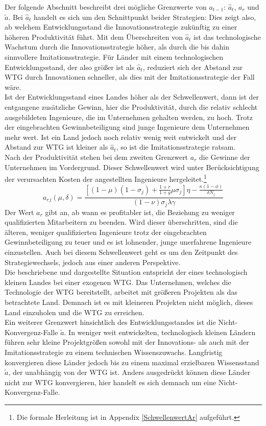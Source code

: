 %
Der folgende Abschnitt beschreibt drei mögliche Grenzwerte von $a_{t-1}$: $\hat{a}_t$, $a_r$ und $\tilde{a}$.  Bei $\hat{a}_t$ handelt es sich um den Schnittpunkt beider Strategien: Dies zeigt also, ab welchem Entwicklungsstand die Innovationsstrategie zukünftig zu einer höheren Produktivität führt.
Mit dem Überschreiten von $\hat{a}_t$ ist das technologische Wachstum durch die \textcolor[rgb]{0.74,0.97,0.22}{Innovationsstrategie} höher, als durch die bis dahin sinnvollere \textcolor[rgb]{0,0.32,0}{Imitationsstrategie}. 
Für Länder mit einem technologischen Entwicklungsstand, der also größer ist als $\hat{a}_t$, reduziert sich der Abstand zur WTG durch Innovationen schneller, als dies mit der \textcolor[rgb]{0,0.32,0}{Imitationsstrategie} der Fall wäre.\\
%
Ist der Entwicklungsstand eines Landes höher als der Schwellenwert, dann ist der entgangene zusätzliche Gewinn, hier die Produktivität, durch die relativ schlecht ausgebildeten Ingenieure, die im Unternehmen gehalten werden, zu hoch. Trotz der eingebrachten Gewinnbeteiligung sind junge Ingenieure dem Unternehmen mehr wert. Ist ein Land jedoch noch relativ wenig weit entwickelt und der Abstand zur WTG ist kleiner als $\hat{a}_t$, so ist die \textcolor[rgb]{0,0.32,0}{Imitationsstrategie} ratsam.\\
%
Nach der Produktivität stehen bei dem zweiten Grenzwert $a_r$ die Gewinne der Unternehmen im Vordergrund. Dieser Schwellenwert wird unter Berücksichtigung der verursachten Kosten der angestellten Ingenieure hergeleitet.\footnote{Die formale Herleitung ist in Appendix \ref{SchwellenwertAr} aufgeführt.}
%
	\begin{equation}
		a_r{_j}(\mu,\delta)=\frac{[(1-\mu)(1-\sigma_j)+\frac{1+r}{1+g}\mu\sigma_j]\eta-\frac{\kappa(1-\phi)}{\delta N_j}}{(1-\nu)\sigma_j\lambda\gamma} \label{Schwellenwert Kosten}
	\end{equation}
%
Der Wert $a_r$ gibt an, ab wann es profitabler ist, die Beziehung zu weniger qualifizierten Mitarbeitern zu beenden. Wird dieser überschritten, sind die älteren, weniger qualifizierten Ingenieure trotz der eingebrachten Gewinnbeteiligung zu teuer und es ist lohnender, junge unerfahrene Ingenieure einzustellen. Auch bei diesem Schwellenwert geht es um den Zeitpunkt des Strategiewechsels, jedoch aus einer anderen Perspektive.\\
%
Die beschriebene und dargestellte Situation entspricht der eines technologisch kleinen Landes bei einer exogenen WTG. Das Unternehmen, welches die Technologie der WTG bereitstellt, arbeitet mit größeren Projekten als das betrachtete Land. Demnach ist es mit kleineren Projekten nicht möglich, dieses Land einzuholen und die WTG zu erreichen.\\ Ein weiterer Grenzwert hinsichtlich des Entwicklungsstandes ist die Nicht-Konvergenz-Falle $\tilde{a}$. In weniger weit entwickelten, technologisch kleinen Ländern führen sehr kleine Projektgrößen sowohl mit der Innovations- als auch mit der Imitationsstrategie zu einem technischen Wissenszuwachs. Langfristig konvergieren diese Länder jedoch bis zu einem maximal erzielbaren Wissensstand $\tilde{a}$, der unabhängig von der WTG ist. Anders ausgedrückt können diese Länder nicht zur WTG konvergieren, hier handelt es sich demnach um eine Nicht-Konvergenz-Falle. 
